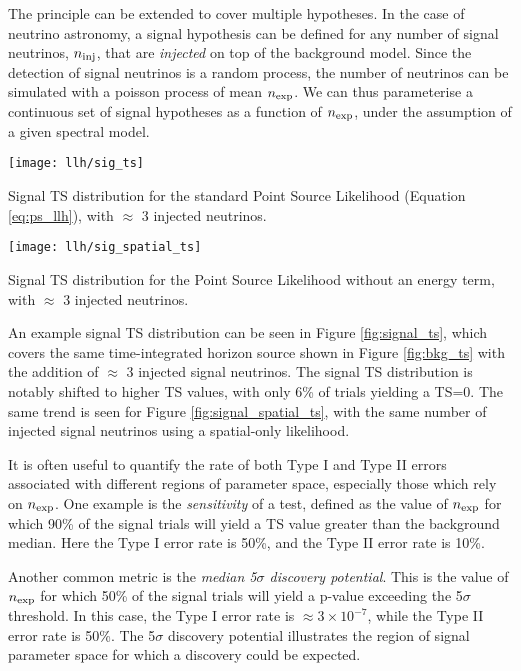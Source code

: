 The principle can be extended to cover multiple hypotheses. In the case of neutrino astronomy, a signal hypothesis can be defined for any number of signal neutrinos, $n_{\textup{inj}}$, that are \emph{injected} on top of the background model. Since the detection of signal neutrinos is a random process, the number of neutrinos can be simulated with a poisson process of mean $n_{\textup{exp}}$. We can thus parameterise a continuous set of signal hypotheses as a function of $n_{\textup{exp}}$, under the assumption of a given spectral model. 

\begin{marginfigure}
	\centering \texttt{[image: llh/sig\_ts]}
	\caption{Signal TS distribution for the standard Point Source Likelihood (Equation \ref{eq:ps_llh}), with $\approx$ 3 injected neutrinos.}
	\label{fig:signal_ts}
\end{marginfigure}

\begin{marginfigure}
	\centering \texttt{[image: llh/sig\_spatial\_ts]}
	\caption{Signal TS distribution for the Point Source Likelihood without an energy term, with $\approx$ 3 injected neutrinos.}
	\label{fig:signal_spatial_ts}
\end{marginfigure}

An example signal TS distribution can be seen in Figure \ref{fig:signal_ts}, which covers the same time-integrated horizon source shown in Figure \ref{fig:bkg_ts} with the addition of $\approx$ 3 injected signal neutrinos. The signal TS distribution is notably shifted to higher TS values, with only 6\% of trials yielding a TS=0. The same trend is seen for Figure \ref{fig:signal_spatial_ts}, with the same number of injected signal neutrinos using a spatial-only likelihood.

It is often useful to quantify the rate of both Type  I and Type II errors associated with different regions of parameter space, especially those which rely on $n_{\textup{exp}}$. One example is the \emph{sensitivity} of a test, defined as the value of $n_{\textup{exp}}$ for which 90\% of the signal trials will yield a TS value greater than the background median. Here the Type I error rate is 50\%, and the Type II error rate is 10\%. 

Another common metric is the \emph{median 5$\sigma$ discovery potential}. This is the value of $n_{\textup{exp}}$ for which 50\% of the signal trials will yield a p-value exceeding the 5$\sigma$ threshold. In this case, the Type I error rate is $\approx 3 \times 10^{-7}$, while the Type II error rate is 50\%. The 5$\sigma$ discovery potential illustrates the region of signal parameter space for which a discovery could be expected. 


